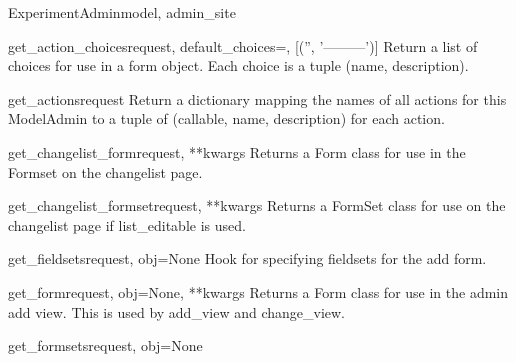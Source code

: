 \documentclass[letterpaper,10pt,english]{sphinxmanual}
\begin{document}
\begin{classdesc}{ExperimentAdmin}{model, admin\_site}
\hypertarget{data.admin.ExperimentAdmin.get_action_choices}{}\begin{methoddesc}{get\_action\_choices}{request, default\_choices=, {[}('', '---------'){]}}
Return a list of choices for use in a form object.  Each choice is a
tuple (name, description).
\end{methoddesc}

\hypertarget{data.admin.ExperimentAdmin.get_actions}{}\begin{methoddesc}{get\_actions}{request}
Return a dictionary mapping the names of all actions for this
ModelAdmin to a tuple of (callable, name, description) for each action.
\end{methoddesc}

\hypertarget{data.admin.ExperimentAdmin.get_changelist_form}{}\begin{methoddesc}{get\_changelist\_form}{request, **kwargs}
Returns a Form class for use in the Formset on the changelist page.
\end{methoddesc}

\hypertarget{data.admin.ExperimentAdmin.get_changelist_formset}{}\begin{methoddesc}{get\_changelist\_formset}{request, **kwargs}
Returns a FormSet class for use on the changelist page if list\_editable
is used.
\end{methoddesc}

\hypertarget{data.admin.ExperimentAdmin.get_fieldsets}{}\begin{methoddesc}{get\_fieldsets}{request, obj=None}
Hook for specifying fieldsets for the add form.
\end{methoddesc}

\hypertarget{data.admin.ExperimentAdmin.get_form}{}\begin{methoddesc}{get\_form}{request, obj=None, **kwargs}
Returns a Form class for use in the admin add view. This is used by
add\_view and change\_view.
\end{methoddesc}

\hypertarget{data.admin.ExperimentAdmin.get_formsets}{}\begin{methoddesc}{get\_formsets}{request, obj=None}\end{methoddesc}


\end{classdesc}
\end{document}
